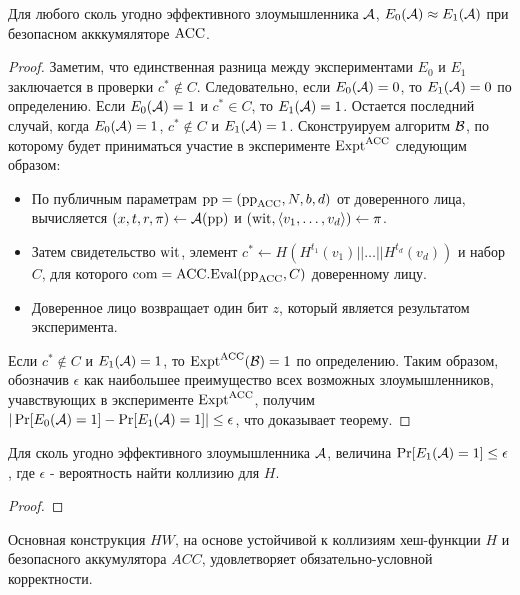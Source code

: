 \begin{theorem}
	\label{lemma:7}
	Для любого сколь угодно эффективного злоумышленника $\mathcal{A}$, $E_0(\mathcal{A}) \approx E_1(\mathcal{A})$ при безопасном акккумяляторе $\text{ACC}$.
\end{theorem}

\begin{proof}
	Заметим, что единственная разница между экспериментами  $E_0$ и $E_1$ заключается в проверки $c^* \notin C$.
	Следовательно, если $E_0(\mathcal{A}) = 0$, то $E_1(\mathcal{A}) = 0$ по определению.
	Если $E_0(\mathcal{A}) = 1$ и $c^* \in C$, то $E_1(\mathcal{A}) = 1$.
	Остается последний случай, когда $E_0(\mathcal{A}) = 1$, $c^* \notin C$ и $E_1(\mathcal{A}) = 1$.
	Сконструируем алгоритм $\mathcal{B}$, по которому будет приниматься участие в эксперименте $\text{Expt}^\text{ACC}$ следующим образом:
	\begin{itemize}
		\item По публичным параметрам $\text{pp} = (\text{pp}_{\text{ACC}}, N, b, d)$ от доверенного лица, вычисляется $(x, t, r, \pi) \leftarrow \mathcal{A}(\text{pp})$ и $(\text{wit}, \langle v_1, \dots, v_d \rangle) \leftarrow \pi$.
		\item Затем свидетельство $\text{wit}$, элемент $c^* \leftarrow H(H^{t_1}(v_1) || \dots || H^{t_d}(v_d))$ и набор $C$, для которого $\text{com} = \text{ACC}.\text{Eval}(\text{pp}_{\text{ACC}}, C)$ доверенному лицу.
		\item Доверенное лицо возвращает один бит $z$, который является результатом эксперимента.
	\end{itemize}
	Если $c^* \notin C$ и $E_1(\mathcal{A}) = 1$, то $\text{Expt}^\text{ACC}(\mathcal{B}) = 1$ по определению.
	Таким образом, обозначив $\epsilon$ как наибольшее преимущество всех возможных злоумышленников, учавствующих в эксперименте $\text{Expt}^\text{ACC}$, получим $|\Pr[E_0(\mathcal{A}) = 1] - \Pr[E_1(\mathcal{A}) = 1]| \leq \epsilon$, что доказывает теорему.
\end{proof}

\begin{theorem}
	\label{lemma:8}
	Для сколь угодно эффективного злоумышленника $\mathcal{A}$, величина $\Pr[E_1(\mathcal{A}) = 1] \leq \epsilon$, где $\epsilon$ - вероятность найти коллизию для $H$.
\end{theorem}

\begin{proof}
\end{proof}

\begin{theorem}
	\label{lemma:6}
	Основная конструкция $HW$, на основе устойчивой к коллизиям хеш-функции $H$ и безопасного аккумулятора $ACC$, удовлетворяет обязательно-условной корректности.
\end{theorem}

